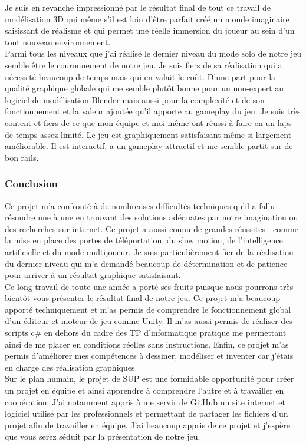 \documentclass[12pt]{article}
\begin{document}
Je suis en revanche impressionné par le résultat final de tout ce travail de modélisation 3D qui même s’il est loin d'être parfait créé un monde imaginaire saisissant de réalisme et qui permet une réelle immersion du joueur au sein d'un tout nouveau environnement.\\
Parmi tous les niveaux que j'ai réalisé le dernier niveau du mode solo de notre jeu semble être le couronnement de notre jeu. Je suis fiers de sa réalisation qui a nécessité beaucoup de temps mais qui en valait le coût. D’une part pour la qualité graphique globale qui me semble plutôt bonne pour un non-expert au logiciel de modélisation Blender mais aussi pour la complexité et de son fonctionnement et la valeur ajoutée qu’il apporte au gameplay du jeu. 
Je suis très content et fiers de ce que mon équipe et moi-même ont réussi à faire en un laps de temps assez limité. Le jeu est graphiquement satisfaisant même si largement améliorable. Il est interactif, a un gameplay attractif et me semble partit sur de bon rails.

\subsubsection{Conclusion}

Ce projet m'a confronté à de nombreuses difficultés techniques qu'il a fallu résoudre une à une en trouvant des solutions adéquates par notre imagination ou des recherches sur internet. Ce projet a aussi connu de grandes réussites : comme la mise en place des portes de téléportation, du slow motion, de l'intelligence artificielle et du mode multijoueur. Je suis particulièrement fier de la réalisation du dernier niveau qui m'a demandé beaucoup de détermination et de patience pour arriver à un résultat graphique satisfaisant.\\
Ce long travail de toute une année a porté ses fruits puisque nous pourrons très bientôt vous présenter le résultat final de notre jeu. Ce projet m'a beaucoup apporté techniquement et m'as permis de comprendre le fonctionnement global d'un éditeur et moteur de jeu comme Unity. Il m'as aussi permis de réaliser des scripts c\# en dehors du cadre des TP d'informatique pratique me permettant ainsi de me placer en conditions réelles sans instructions. Enfin, ce projet m'as permis d'améliorer mes compétences à dessiner, modéliser et inventer car j'étais en charge des réalisation graphiques.\\
Sur le plan humain, le projet de SUP est une formidable opportunité pour créer un projet en équipe et ainsi apprendre à comprendre l'autre et à travailler en coopération. J'ai notamment appris à me servir de GitHub un site internet et logiciel utilisé par les professionnels et permettant de partager les fichiers d'un projet afin de travailler en équipe. J'ai beaucoup appris de ce projet et j'espère que vous serez séduit par la présentation de notre jeu.
\end{document}

